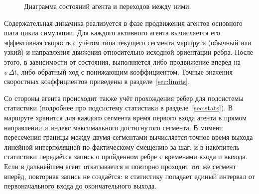 \begin{figure}
\caption{Диаграмма состояний агента и переходов между ними.}
\label{fig:agent-fsm}
\end{figure}

Содержательная динамика реализуется в фазе продвижения агентов основного шага цикла симуляции. 
Для каждого активного агента вычисляется его эффективная скорость с учётом типа текущего сегмента 
маршрута (обычный или узкий) и направления движения относительно исходной ориентации ребра. 
После этого, в зависимости от состояния, выполняется либо продвижение вперёд на $v \, \Delta t$, либо 
обратный ход с понижающим коэффициентом. Точные значения скоростных коэффициентов приведены в разделе~\ref{sec:limits}.

Со стороны агента происходит также учёт прохождения рёбер для подсистемы статистики 
(подробнее про подсистему статистики в разделе~\ref{sec:stats}). В маршруте хранится для каждого 
сегмента время первого входа агента в прямом направлении и индекс максимального достигнутого сегмента. 
В момент пересечения границы между двумя сегментами вычисляется точное время выхода линейной интерполяцией 
по фактическому смещению за шаг, и в накопитель статистики передаётся запись о пройденном ребре с 
временами входа и выхода. Если в дальнейшем агент откатывается и повторно проходит тот же сегмент вперёд, 
повторная запись не создаётся: в статистику попадает единый интервал от первоначального входа до 
окончательного выхода.

